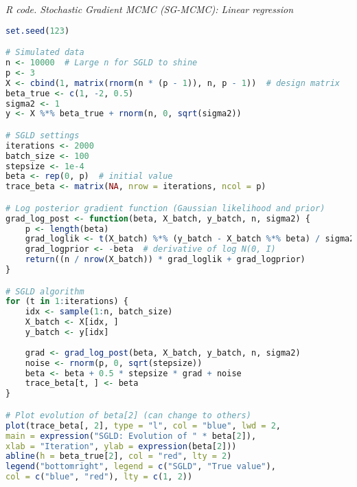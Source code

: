 \begin{tcolorbox}[enhanced,width=4.67in,center upper,
	fontupper=\large\bfseries,drop shadow southwest,sharp corners]
	\textit{R code. Stochastic Gradient MCMC (SG-MCMC): Linear regression}
	\begin{VF}
		\begin{lstlisting}[language=R]
set.seed(123)

# Simulated data
n <- 10000  # Large n for SGLD to shine
p <- 3
X <- cbind(1, matrix(rnorm(n * (p - 1)), n, p - 1))  # design matrix
beta_true <- c(1, -2, 0.5)
sigma2 <- 1
y <- X %*% beta_true + rnorm(n, 0, sqrt(sigma2))

# SGLD settings
iterations <- 2000
batch_size <- 100
stepsize <- 1e-4
beta <- rep(0, p)  # initial value
trace_beta <- matrix(NA, nrow = iterations, ncol = p)

# Log posterior gradient function (Gaussian likelihood and prior)
grad_log_post <- function(beta, X_batch, y_batch, n, sigma2) {
	p <- length(beta)
	grad_loglik <- t(X_batch) %*% (y_batch - X_batch %*% beta) / sigma2
	grad_logprior <- -beta  # derivative of log N(0, I)
	return((n / nrow(X_batch)) * grad_loglik + grad_logprior)
}

# SGLD algorithm
for (t in 1:iterations) {
	idx <- sample(1:n, batch_size)
	X_batch <- X[idx, ]
	y_batch <- y[idx]
	
	grad <- grad_log_post(beta, X_batch, y_batch, n, sigma2)
	noise <- rnorm(p, 0, sqrt(stepsize))
	beta <- beta + 0.5 * stepsize * grad + noise
	trace_beta[t, ] <- beta
}

# Plot evolution of beta[2] (can change to others)
plot(trace_beta[, 2], type = "l", col = "blue", lwd = 2,
main = expression("SGLD: Evolution of " * beta[2]),
xlab = "Iteration", ylab = expression(beta[2]))
abline(h = beta_true[2], col = "red", lty = 2)
legend("bottomright", legend = c("SGLD", "True value"),
col = c("blue", "red"), lty = c(1, 2))
		\end{lstlisting}
	\end{VF}
\end{tcolorbox}